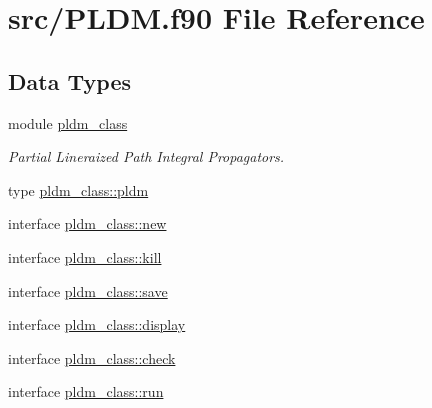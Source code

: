 \hypertarget{_p_l_d_m_8f90}{\section{src/\+P\+L\+D\+M.f90 File Reference}
\label{_p_l_d_m_8f90}
}
\subsection*{Data Types}
\begin{DoxyCompactItemize}
\item 
module \hyperlink{classpldm__class}{pldm\+\_\+class}
\begin{DoxyCompactList}\small\item\em Partial Lineraized Path Integral Propagators. \end{DoxyCompactList}\item 
type \hyperlink{structpldm__class_1_1pldm}{pldm\+\_\+class\+::pldm}
\item 
interface \hyperlink{interfacepldm__class_1_1new}{pldm\+\_\+class\+::new}
\item 
interface \hyperlink{interfacepldm__class_1_1kill}{pldm\+\_\+class\+::kill}
\item 
interface \hyperlink{interfacepldm__class_1_1save}{pldm\+\_\+class\+::save}
\item 
interface \hyperlink{interfacepldm__class_1_1display}{pldm\+\_\+class\+::display}
\item 
interface \hyperlink{interfacepldm__class_1_1check}{pldm\+\_\+class\+::check}
\item 
interface \hyperlink{interfacepldm__class_1_1run}{pldm\+\_\+class\+::run}
\end{DoxyCompactItemize}
